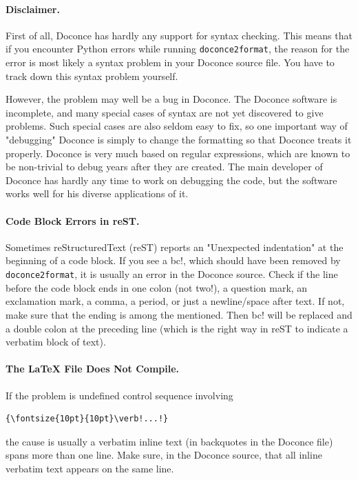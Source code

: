 \documentclass{article}
\begin{document}
\paragraph{Disclaimer.}
First of all, Doconce has hardly any support for
syntax checking. This means that if you encounter Python errors while
running {\fontsize{10pt}{10pt}\verb!doconce2format!}, the reason for the error is most likely a
syntax problem in your Doconce source file. You have to track down
this syntax problem yourself.

However, the problem may well be a bug in Doconce. The Doconce
software is incomplete, and many special cases of syntax are not yet
discovered to give problems. Such special cases are also seldom easy to
fix, so one important way of "debugging" Doconce is simply to change
the formatting so that Doconce treats it properly. Doconce is very much
based on regular expressions, which are known to be non-trivial to
debug years after they are created. The main developer of Doconce has
hardly any time to work on debugging the code, but the software works
well for his diverse applications of it.

\paragraph{Code Block Errors in reST.}
Sometimes reStructuredText (reST) reports an "Unexpected indentation"
at the beginning of a code block. If you see a {\fontsize{10pt}{10pt}\verb!!bc!}, which should
have been removed by {\fontsize{10pt}{10pt}\verb!doconce2format!}, it is usually an error in the
Doconce source. Check if the line before the code block ends in
one colon (not two!), a question mark, an exclamation mark, a comma, a
period, or just a newline/space after text. If not, make sure that
the ending is among the mentioned. Then {\fontsize{10pt}{10pt}\verb!!bc!} will be replaced 
and a double colon at the preceding line (which is the right way in
reST to indicate a verbatim block of text).

\paragraph{The {\LaTeX} File Does Not Compile.}
If the problem is undefined control sequence involving
\begin{Verbatim}[fontsize=\fontsize{9pt}{9pt},tabsize=8,baselinestretch=0.85,
fontfamily=tt,xleftmargin=7mm]
{\fontsize{10pt}{10pt}\verb!...!}
\end{Verbatim}
\noindent
the cause is usually a verbatim inline text (in backquotes in the
Doconce file) spans more than one line. Make sure, in the Doconce source,
that all inline verbatim text appears on the same line.
\end{document}
